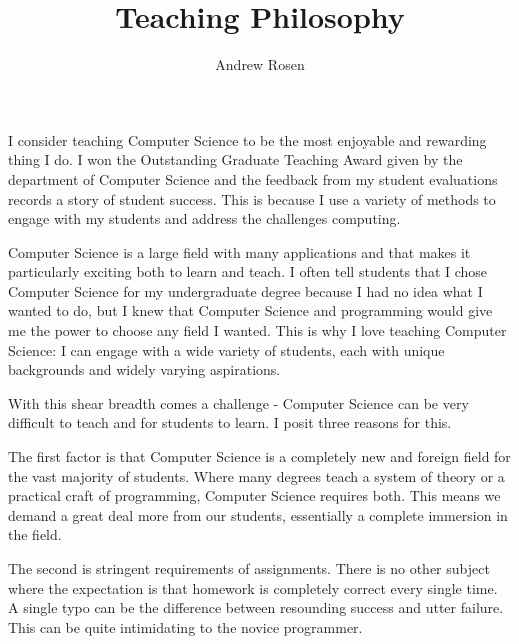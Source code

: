 \documentclass[12pt,a4paper]{article}
\author{Andrew Rosen}
\title{Teaching Philosophy}
\date{}
\begin{document}
\maketitle


I consider teaching Computer Science to be the most enjoyable and rewarding thing I do.
I won the Outstanding Graduate Teaching Award given by the department of Computer Science and the feedback from my  student evaluations records a story of student success. 
This is because I use a variety of methods to engage with my students and address the challenges computing.



% 


Computer Science is a large field with many applications and that makes it particularly exciting both to learn and teach.
I often tell students that I chose Computer Science for my undergraduate degree because I had no idea what I wanted to do, but I knew that Computer Science and programming would give me the power to choose any field I wanted.
This is why I love teaching Computer Science:  I can engage with a wide variety of students, each with unique backgrounds and widely varying aspirations.

With this shear breadth comes a challenge - Computer Science can be very difficult to teach and for students to learn.
I posit three reasons for this.

The first factor is that Computer Science is a completely new and foreign field for the vast majority of students.
Where many degrees teach a system of theory or a practical craft of programming, Computer Science requires both. 
This means we demand a great deal more from our students, essentially a complete immersion in the field.

The second is stringent requirements of assignments.
There is no other subject where the expectation is that homework is completely correct every single time.
A single typo can be the difference between resounding success and utter failure.
This can be quite intimidating to the novice programmer.
\end{document}
